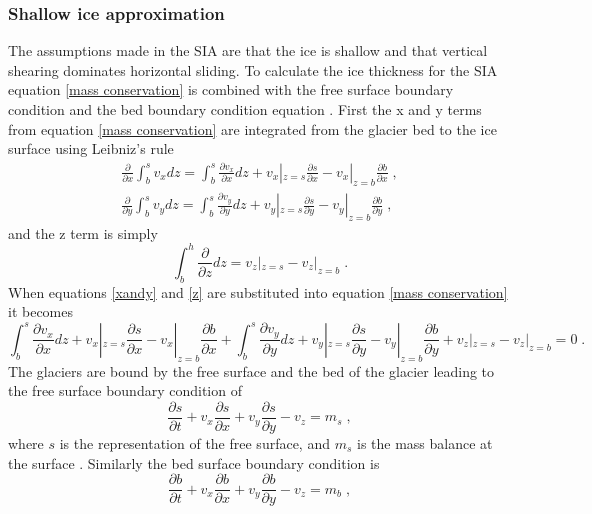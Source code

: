 \documentclass{article}
\begin{document}
\subsubsection{Shallow ice approximation}
The assumptions made in the SIA are that the ice is shallow and that vertical shearing dominates horizontal sliding. To calculate the ice thickness for the SIA equation \ref{mass conservation} is combined with the free surface boundary condition and the bed boundary condition equation \citep{LEMEUR2004, Greve2009}. First the x and y terms from equation \ref{mass conservation} are integrated from the glacier bed to the ice surface using Leibniz's rule
\begin{subequations} \label{xandy}
\begin{gather}
    \frac{\partial}{\partial x}\int_b^s v_x dz = \int_b^s \frac{\partial v_x}{\partial x}dz+v_x|_{z=s}\frac{\partial s}{\partial x}-v_x|_{z=b}\frac{\partial b}{\partial x} \; ,\\
    \frac{\partial}{\partial y}\int_b^s v_y dz = \int_b^s \frac{\partial v_y}{\partial y}dz+v_y|_{z=s}\frac{\partial s}{\partial y}-v_y|_{z=b}\frac{\partial b}{\partial y} \; ,
\end{gather}
\end{subequations}
and the z term is simply
\begin{equation}\label{z}
    \int_b^h\frac{\partial}{\partial z}dz = v_z|_{z=s}-v_z|_{z=b} \; .
\end{equation}
When equations \ref{xandy} and \ref{z} are substituted into equation \ref{mass conservation} it becomes
\begin{equation}
    \int_b^s \frac{\partial v_x}{\partial x}dz+v_x|_{z=s}\frac{\partial s}{\partial x}-v_x|_{z=b}\frac{\partial b}{\partial x}+\int_b^s \frac{\partial v_y}{\partial y}dz+v_y|_{z=s}\frac{\partial s}{\partial y}-v_y|_{z=b}\frac{\partial b}{\partial y}+v_z|_{z=s}-v_z|_{z=b} = 0 \; .
\end{equation}
The glaciers are bound by the free surface and the bed of the glacier leading to the free surface boundary condition of 
\begin{equation}\label{free surface}
\frac{\partial s}{\partial t} + v_x \frac{\partial s}{\partial x}+ v_y \frac{\partial s}{\partial y} -v_z = m_s \; ,
\end{equation}
where $s$ is the representation of the free surface, and $m_s$ is the mass balance at the surface \citep{LEMEUR2004, Greve2009}. Similarly the bed surface boundary condition is
\begin{equation}\label{bed}
\frac{\partial b}{\partial t} + v_x \frac{\partial b}{\partial x}+ v_y \frac{\partial b}{\partial y} -v_z = m_b \; ,
\end{equation}
\end{document}
